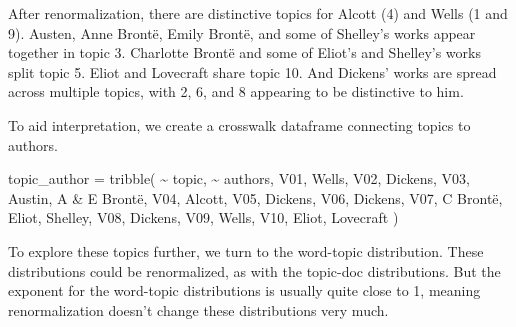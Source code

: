 \documentclass[
]{article}
\newenvironment{Shaded}{\begin{snugshade}}{\end{snugshade}}
\newcommand{\FunctionTok}[1]{\textcolor[rgb]{0.28,0.35,0.67}{#1}}
\newcommand{\NormalTok}[1]{\textcolor[rgb]{0.00,0.23,0.31}{#1}}
\newcommand{\OtherTok}[1]{\textcolor[rgb]{0.00,0.23,0.31}{#1}}
\newcommand{\SpecialCharTok}[1]{\textcolor[rgb]{0.37,0.37,0.37}{#1}}
\newcommand{\StringTok}[1]{\textcolor[rgb]{0.13,0.47,0.30}{#1}}
\begin{document}
After renormalization, there are distinctive topics for Alcott (4) and
Wells (1 and 9). Austen, Anne Brontë, Emily Brontë, and some of
Shelley's works appear together in topic 3. Charlotte Brontë and some of
Eliot's and Shelley's works split topic 5. Eliot and Lovecraft share
topic 10. And Dickens' works are spread across multiple topics, with 2,
6, and 8 appearing to be distinctive to him.

To aid interpretation, we create a crosswalk dataframe connecting topics
to authors.

\begin{Shaded}
\begin{Highlighting}[]
\NormalTok{topic\_author }\OtherTok{=} \FunctionTok{tribble}\NormalTok{(}
    \SpecialCharTok{\textasciitilde{}}\NormalTok{ topic, }\SpecialCharTok{\textasciitilde{}}\NormalTok{ authors,}
    \StringTok{\textquotesingle{}V01\textquotesingle{}}\NormalTok{, }\StringTok{\textquotesingle{}Wells\textquotesingle{}}\NormalTok{, }
    \StringTok{\textquotesingle{}V02\textquotesingle{}}\NormalTok{, }\StringTok{\textquotesingle{}Dickens\textquotesingle{}}\NormalTok{, }
    \StringTok{\textquotesingle{}V03\textquotesingle{}}\NormalTok{, }\StringTok{\textquotesingle{}Austin, A \& E Brontë\textquotesingle{}}\NormalTok{, }
    \StringTok{\textquotesingle{}V04\textquotesingle{}}\NormalTok{, }\StringTok{\textquotesingle{}Alcott\textquotesingle{}}\NormalTok{, }
    \StringTok{\textquotesingle{}V05\textquotesingle{}}\NormalTok{, }\StringTok{\textquotesingle{}Dickens\textquotesingle{}}\NormalTok{, }
    \StringTok{\textquotesingle{}V06\textquotesingle{}}\NormalTok{, }\StringTok{\textquotesingle{}Dickens\textquotesingle{}}\NormalTok{, }
    \StringTok{\textquotesingle{}V07\textquotesingle{}}\NormalTok{, }\StringTok{\textquotesingle{}C Brontë, Eliot, Shelley\textquotesingle{}}\NormalTok{, }
    \StringTok{\textquotesingle{}V08\textquotesingle{}}\NormalTok{, }\StringTok{\textquotesingle{}Dickens\textquotesingle{}}\NormalTok{, }
    \StringTok{\textquotesingle{}V09\textquotesingle{}}\NormalTok{, }\StringTok{\textquotesingle{}Wells\textquotesingle{}}\NormalTok{, }
    \StringTok{\textquotesingle{}V10\textquotesingle{}}\NormalTok{, }\StringTok{\textquotesingle{}Eliot, Lovecraft\textquotesingle{}}
\NormalTok{)}
\end{Highlighting}
\end{Shaded}

To explore these topics further, we turn to the word-topic distribution.
These distributions could be renormalized, as with the topic-doc
distributions. But the exponent for the word-topic distributions is
usually quite close to 1, meaning renormalization doesn't change these
distributions very much.
\end{document}
